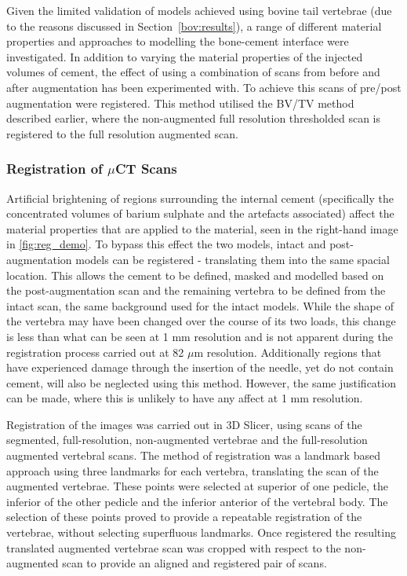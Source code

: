Given the limited validation of models achieved using bovine tail vertebrae (due to the reasons discussed in Section~\ref{bov:results}), a range of different material properties and approaches to modelling the bone-cement interface were investigated.
In addition to varying the material properties of the injected volumes of cement, the effect of using a combination of scans from before and after augmentation has been experimented with.
To achieve this scans of pre/post augmentation were registered.
This method utilised the BV/TV method described earlier, where the non-augmented full resolution thresholded scan is registered to the full resolution augmented scan.

\subsubsection{Registration of $\mu$CT Scans}

Artificial brightening of regions surrounding the internal cement (specifically the concentrated volumes of barium sulphate and the artefacts associated) affect the material properties that are applied to the material, seen in the right-hand image in \cref{fig:reg_demo}.
To bypass this effect the two models, intact and post-augmentation models can be registered - translating them into the same spacial location.
This allows the cement to be defined, masked and modelled based on the post-augmentation scan and the remaining vertebra to be defined from the intact scan, the same background used for the intact models.
While the shape of the vertebra may have been changed over the course of its two loads, this change is less than what can be seen at 1 mm resolution and is not apparent during the registration process carried out at 82 $\mu$m resolution.
Additionally regions that have experienced damage through the insertion of the needle, yet do not contain cement, will also be neglected using this method.
However, the same justification can be made, where this is unlikely to have any affect at 1 mm resolution.

Registration of the images was carried out in 3D Slicer, using scans of the segmented, full-resolution, non-augmented vertebrae and the full-resolution augmented vertebral scans.
The method of registration was a landmark based approach using three landmarks for each vertebra, translating the scan of the augmented vertebrae.
These points were selected at superior of one pedicle, the inferior of the other pedicle and the inferior anterior of the vertebral body.
The selection of these points proved to provide a repeatable registration of the vertebrae, without selecting superfluous landmarks.
Once registered the resulting translated augmented vertebrae scan was cropped with respect to the non-augmented scan to provide an aligned and registered pair of scans.

